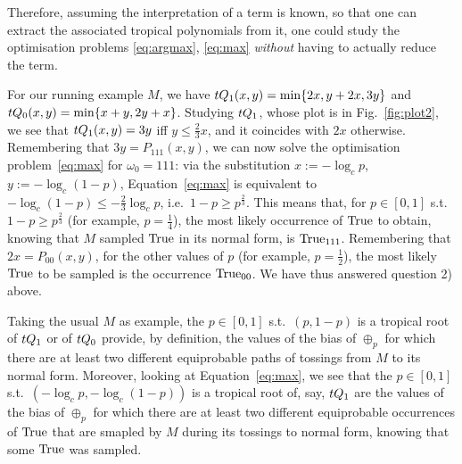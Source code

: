 Therefore, assuming the interpretation of a term is known, 
so that one can extract the associated tropical polynomials from it,
one could study the optimisation problems \ref{eq:argmax}, \ref{eq:max} \emph{without} having to actually reduce the term. 


For our running example $M$, we have $\trop Q_1(x,y)=\min\set{2x,y+2x,3y}$ and $\trop Q_0(x,y)=\min\set{x+y,2y+x}$.
Studying $\trop Q_1$, whose plot is in Fig.~\ref{fig:plot2}, we see that $\trop Q_1(x,y)=3y$ iff $y\leq \frac{2}{3}x$, and it coincides with $2x$ otherwise.
Remembering that $3y=P_{111}(x,y)$, we can now solve the optimisation problem~\ref{eq:max} for $\omega_0=111$:
via the substitution $x:=-\log_c p$, $y:=-\log_c (1-p)$, Equation~\ref{eq:max} is equivalent to $-\log_c (1-p)\leq -\frac{2}{3}\log_c p$, i.e.\ $1-p\geq p^{\frac{2}{3}}$.
This means that, for $p\in[0,1]$ s.t.\ $1-p\geq p^{\frac{2}{3}}$ (for example, $p=\frac{1}{4}$), the most likely occurrence of $\mathrm{True}$ to obtain, knowing that $M$ sampled $\mathrm{True}$ in its normal form, is $\mathrm{True}_{111}$.
Remembering that $2x=P_{00}(x,y)$, for the other values of $p$ (for example, $p=\frac{1}{2}$), the most likely $\mathrm{True}$ to be sampled is the occurrence $\mathrm{True}_{00}$.
We have thus answered question 2) above.

\begin{remark}\label{rem:troproots}
 Taking the usual $M$ as example, the $p\in[0,1]$ s.t.\ $(p,1-p)$ is a tropical root of $\trop Q_1$ or of $\trop Q_0$ provide, by definition, the values of the bias of $\oplus_p$ for which there are at least two different equiprobable paths of tossings from $M$ to its normal form.
 Moreover, looking at Equation~\ref{eq:max}, we see that the $p\in[0,1]$ s.t.\ $(-\log_c p,-\log_c(1-p))$ is a tropical root of, say, $\trop Q_1$ are the values of the bias of $\oplus_p$ for which there are at least two different equiprobable occurrences of $\mathrm{True}$ that are smapled by $M$ during its tossings to normal form, knowing that some $\mathrm{True}$ was sampled.
\end{remark}

